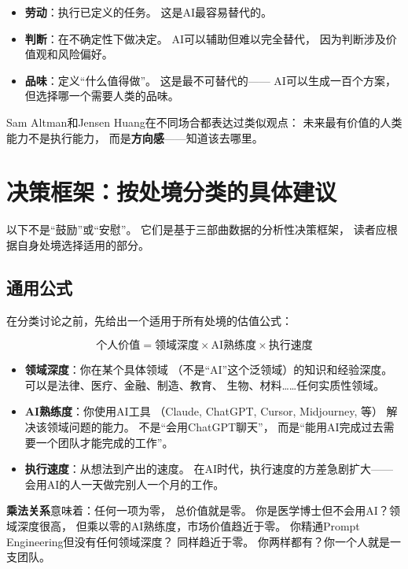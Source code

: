 \begin{itemize}
  \item \textbf{劳动}：执行已定义的任务。
    这是AI最容易替代的。
  \item \textbf{判断}：在不确定性下做决定。
    AI可以辅助但难以完全替代，
    因为判断涉及价值观和风险偏好。
  \item \textbf{品味}：定义``什么值得做''。
    这是最不可替代的——
    AI可以生成一百个方案，
    但选择哪一个需要人类的品味。
\end{itemize}

Sam Altman和Jensen Huang在不同场合都表达过类似观点：
未来最有价值的人类能力不是执行能力，
而是\textbf{方向感}——知道该去哪里。


\section{决策框架：按处境分类的具体建议}
\label{sec:fg-decisions}

以下不是``鼓励''或``安慰''。
它们是基于三部曲数据的分析性决策框架，
读者应根据自身处境选择适用的部分。

\subsection{通用公式}

在分类讨论之前，先给出一个适用于所有处境的估值公式：

\begin{keybox}[2026年个人市场价值公式]
$$\text{个人价值} = \text{领域深度} \times \text{AI熟练度}
  \times \text{执行速度}$$

\begin{itemize}
  \item \textbf{领域深度}：你在某个具体领域
    （不是``AI''这个泛领域）的知识和经验深度。
    可以是法律、医疗、金融、制造、教育、
    生物、材料……任何实质性领域。
  \item \textbf{AI熟练度}：你使用AI工具
    （Claude, ChatGPT, Cursor, Midjourney, 等）
    解决该领域问题的能力。
    不是``会用ChatGPT聊天''，
    而是``能用AI完成过去需要一个团队才能完成的工作''。
  \item \textbf{执行速度}：从想法到产出的速度。
    在AI时代，执行速度的方差急剧扩大——
    会用AI的人一天做完别人一个月的工作。
\end{itemize}

\textbf{乘法关系}意味着：任何一项为零，
总价值就是零。
你是医学博士但不会用AI？领域深度很高，
但乘以零的AI熟练度，市场价值趋近于零。
你精通Prompt Engineering但没有任何领域深度？
同样趋近于零。
你两样都有？你一个人就是一支团队。
\end{keybox}

